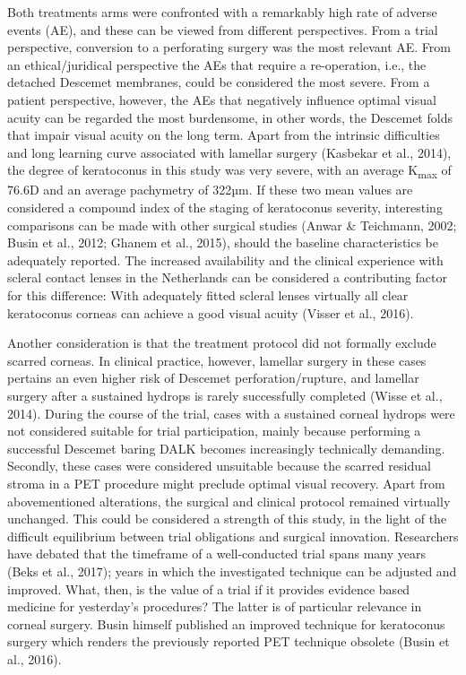 \documentclass[authordate, empirical,issue]{jote-new-article}
\begin{document}
	Both treatments arms were confronted with a remarkably high rate of adverse events (AE), and these can be viewed from different perspectives. From a trial perspective, conversion to a perforating surgery was the most relevant AE. From an ethical/juridical perspective the AEs that require a re-operation, i.e., the detached Descemet membranes, could be considered the most severe. From a patient perspective, however, the AEs that negatively influence optimal visual acuity can be regarded the most burdensome, in other words, the Descemet folds that impair visual acuity on the long term. Apart from the intrinsic difficulties and long learning curve associated with lamellar surgery\textsuperscript{ }(Kasbekar et al., 2014), the degree of keratoconus in this study was very severe, with an average K\textsubscript{max} of 76.6D and an average pachymetry of 322µm. If these two mean values are considered a compound index of the staging of keratoconus severity, interesting comparisons can be made with other surgical studies (Anwar \& Teichmann, 2002; Busin et al., 2012; Ghanem et al., 2015), should the baseline characteristics be adequately reported. The increased availability and the clinical experience with scleral contact lenses in the Netherlands can be considered a contributing factor for this difference: With adequately fitted scleral lenses virtually all clear keratoconus corneas can achieve a good visual acuity (Visser et al., 2016).



	Another consideration is that the treatment protocol did not formally exclude scarred corneas. In clinical practice, however, lamellar surgery in these cases pertains an even higher risk of Descemet perforation/rupture, and lamellar surgery after a sustained hydrops is rarely successfully completed (Wisse et al., 2014). During the course of the trial, cases with a sustained corneal hydrops were not considered suitable for trial participation, mainly because performing a successful Descemet baring DALK becomes increasingly technically demanding. Secondly, these cases were considered unsuitable because the scarred residual stroma in a PET procedure might preclude optimal visual recovery. Apart from abovementioned alterations, the surgical and clinical protocol remained virtually unchanged. This could be considered a strength of this study, in the light of the difficult equilibrium between trial obligations and surgical innovation. Researchers have debated that the timeframe of a well-conducted trial spans many years (Beks et al., 2017); years in which the investigated technique can be adjusted and improved. What, then, is the value of a trial if it provides evidence based medicine for yesterday's procedures? The latter is of particular relevance in corneal surgery. Busin himself published an improved technique for keratoconus surgery which renders the previously reported PET technique obsolete (Busin et al., 2016).
\end{document}
